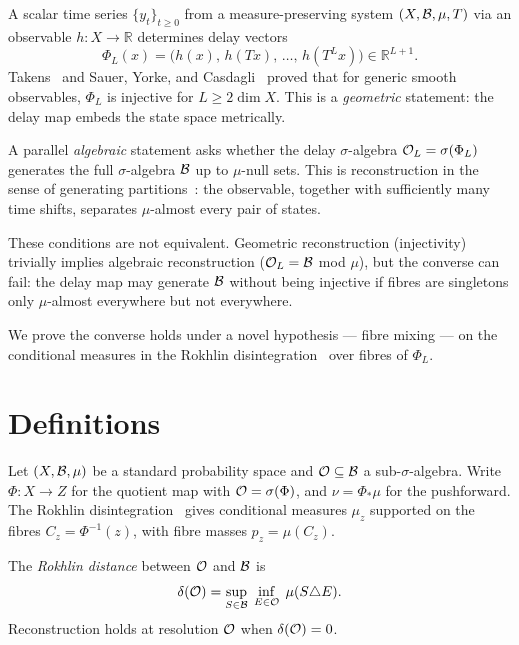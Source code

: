 A scalar time series $\{y_t\}_{t \geq 0}$ from a measure-preserving
system $(X, \mathcal{B}, \mu, T)$ via an observable $h : X \to \mathbb{R}$
determines delay vectors
\begin{equation}\label{eq:delay}
  \Phi_L(x) = \bigl(h(x),\, h(Tx),\, \ldots,\, h(T^L x)\bigr)
  \in \mathbb{R}^{L+1}.
\end{equation}
Takens~\cite{Takens1981} and Sauer, Yorke, and
Casdagli~\cite{SauerYorkeCasdagli1991} proved that for generic
smooth observables, $\Phi_L$ is injective for $L \geq 2 \dim X$.
This is a \emph{geometric} statement: the delay map embeds the
state space metrically.

A parallel \emph{algebraic} statement asks whether the delay
$\sigma$-algebra $\mathcal{O}_L = \sigma(\Phi_L)$ generates the full
$\sigma$-algebra $\mathcal{B}$ up to $\mu$-null sets.  This is
reconstruction in the sense of generating
partitions~\cite{Sinai1959, Krieger1970}: the observable, together
with sufficiently many time shifts, separates $\mu$-almost every
pair of states.

These conditions are not equivalent.  Geometric reconstruction
(injectivity) trivially implies algebraic reconstruction
($\mathcal{O}_L = \mathcal{B}$ mod $\mu$), but the converse can fail: the delay
map may generate $\mathcal{B}$ without being injective if fibres are
singletons only $\mu$-almost everywhere but not everywhere.

We prove the converse holds under a novel hypothesis --- fibre
mixing --- on the conditional measures in the Rokhlin
disintegration~\cite{Rokhlin1952} over fibres of $\Phi_L$.

\section{Definitions}
\label{sec:defs}

Let $(X, \mathcal{B}, \mu)$ be a standard probability space and
$\mathcal{O} \subseteq \mathcal{B}$ a sub-$\sigma$-algebra.  Write $\Phi : X \to Z$
for the quotient map with $\mathcal{O} = \sigma(\Phi)$, and $\nu = \Phi_*\mu$
for the pushforward.  The Rokhlin
disintegration~\cite{Rokhlin1952} gives conditional measures
$\mu_z$ supported on the fibres $C_z = \Phi^{-1}(z)$, with
fibre masses $p_z = \mu(C_z)$.

\begin{definition}
\label{def:rokhlin}
The \emph{Rokhlin distance} between $\mathcal{O}$ and $\mathcal{B}$ is
\begin{equation}\label{eq:rokhlin}
  \delta(\mathcal{O})
  = \sup_{S \in \mathcal{B}}\; \inf_{E \in \mathcal{O}}\; \mu(S \triangle E).
\end{equation}
Reconstruction holds at resolution $\mathcal{O}$ when $\delta(\mathcal{O}) = 0$.
\end{definition}

